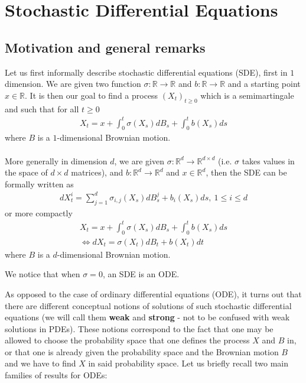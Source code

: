 \documentclass[../mainfile.tex]{subfiles}
\begin{document}
\section{Stochastic Differential Equations}
\subsection{Motivation and general remarks}
Let us first informally describe stochastic differential equations (SDE), first in $1$ dimension. We are given two function $\sigma: \mathbb{R} \to \mathbb{R}$ and $b: \mathbb{R} \to \mathbb{R}$ and a starting point $x \in \mathbb{R}$. It is then our goal to find a process $(X_t)_{t \geq 0}$ which is a semimartingale and such that for all $ t \geq 0$
\begin{align*}
X_t= x + \int_0^t \sigma (X_s) d B_s + \int_0^t b(X_s)ds
\end{align*}
where $B$ is a $1$-dimensional Brownian motion. 
\\\\
More generally in dimension $d$, we are given $\sigma: \mathbb{R}^d \to \mathbb{R}^{d \times d}$ (i.e. $\sigma$ takes values in the space of $d \times d$ matrices), and $b: \mathbb{R}^d \to \mathbb{R}^d$ and $x \in \mathbb{R}^d$, then the SDE can be formally written as 
\begin{align*}
dX_t^i = \sum_{j=1}^d \sigma_{i,j}(X_s)dB_s^j + b_i(X_s)ds, \ 1 \leq i \leq d
\end{align*}
or more compactly
\begin{align*}
X_t = x + \int_0^t \sigma(X_s) d B_s + \int_0^t b(X_s)ds \\
\iff dX_t = \sigma(X_t)dB_t + b(X_t)dt
\end{align*}
where $B$ is a $d$-dimensional Brownian motion.
\begin{rem} We notice that when $\sigma=0$, an SDE is an ODE. 
\end{rem}
As opposed to the case of ordinary differential equations (ODE), it turns out that there are different conceptual notions of solutions of such stochastic differential equations (we will call them \textbf{weak} and \textbf{strong} - not to be confused with weak solutions in PDEs). These notions correspond to the fact that one may be allowed to choose the probability space that one defines the process $X$ and $B$ in, or that one is already given the probability space and the Brownian motion $B$ and we have to find $X$ in said probability space. 
\newpage
Let us briefly recall two main families of results for ODEs:
\end{document}
